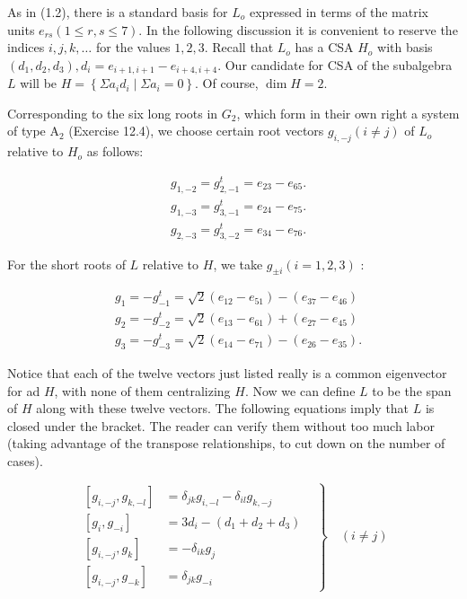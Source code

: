 \documentclass[10pt]{article}
\begin{document}
As in (1.2), there is a standard basis for $L_{o}$ expressed in terms of the matrix units $e_{r s}(1 \leq r, s \leq 7)$. In the following discussion it is convenient to reserve the indices $i, j, k, \ldots$ for the values $1,2,3$. Recall that $L_{o}$ has a CSA $H_{o}$ with basis $\left(d_{1}, d_{2}, d_{3}\right), d_{i}=e_{i+1, i+1}-e_{i+4, i+4}$. Our candidate for CSA of the subalgebra $L$ will be $H=\left\{\Sigma a_{i} d_{i} \mid \Sigma a_{i}=0\right\}$. Of course, $\operatorname{dim} H=2$.

Corresponding to the six long roots in $G_{2}$, which form in their own right a system of type $\mathrm{A}_{2}$ (Exercise 12.4), we choose certain root vectors $g_{i,-j}(i \neq j)$ of $L_{o}$ relative to $H_{o}$ as follows:

$$
\begin{aligned}
& g_{1,-2}=g_{2,-1}^{t}=e_{23}-e_{65} . \\
& g_{1,-3}=g_{3,-1}^{t}=e_{24}-e_{75} . \\
& g_{2,-3}=g_{3,-2}^{t}=e_{34}-e_{76} .
\end{aligned}
$$

For the short roots of $L$ relative to $H$, we take $g_{ \pm i}(i=1,2,3)$ :

$$
\begin{aligned}
& g_{1}=-g_{-1}^{t}=\sqrt{2}\left(e_{12}-e_{51}\right)-\left(e_{37}-e_{46}\right) \\
& g_{2}=-g_{-2}^{t}=\sqrt{2}\left(e_{13}-e_{61}\right)+\left(e_{27}-e_{45}\right) \\
& g_{3}=-g_{-3}^{t}=\sqrt{2}\left(e_{14}-e_{71}\right)-\left(e_{26}-e_{35}\right) .
\end{aligned}
$$

Notice that each of the twelve vectors just listed really is a common eigenvector for ad $H$, with none of them centralizing $H$. Now we can define $L$ to be the span of $H$ along with these twelve vectors. The following equations imply that $L$ is closed under the bracket. The reader can verify them without too much labor (taking advantage of the transpose relationships, to cut down on the number of cases).

$$
\left.\begin{array}{llr}
{\left[g_{i,-j}, g_{k,-l}\right]} & =\delta_{j k} g_{i,-l}-\delta_{i l} g_{k,-j} & \\
{\left[g_{i}, g_{-i}\right]} & =3 d_{i}-\left(d_{1}+d_{2}+d_{3}\right) & \\
{\left[g_{i,-j}, g_{k}\right]} & =-\delta_{i k} g_{j} \\
{\left[g_{i,-j}, g_{-k}\right]} & =\delta_{j k} g_{-i}
\end{array}\right\} \quad(i \neq j)
$$
\end{document}
